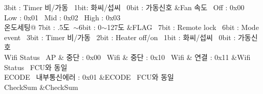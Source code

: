\begin{DoxyItemize}
\begin{longtabu}
 3bit \+: Timer 비/가동~\newline
 1bit\+: 화씨/섭씨~\newline
 0bit \+: 가동신호  &Fan 속도~\newline
 Off \+: 0x00~\newline
 Low \+: 0x01~\newline
 Mid \+: 0x02~\newline
 High \+: 0x03   \\
온도세팅@ 7bit \+: .5도~$\sim$6bit \+: 0$\sim$127도  &F\+L\+AG~\newline
 7bit \+: Remote lock~\newline
 6bit \+: Mode event~\newline
 3bit \+: Timer 비/가동~\newline
 2bit \+: Heater off/on~\newline
 1bit \+: 화씨/섭씨~\newline
 0bit \+: 가동신호   \\
Wifi Status~\newline
 AP \& 중단 \+: 0x00~\newline
 Wifi \& 중단 \+: 0x10~\newline
 Wifi \& 연결 \+: 0x11  &Wifi Status~\newline
 F\+C\+U와 동일   \\
E\+C\+O\+DE~\newline
 내부통신에러 \+: 0x01  &E\+C\+O\+DE~\newline
 F\+C\+U와 동일   \\
Check\+Sum  &Check\+Sum   \\
\end{longtabu}
\end{DoxyItemize}

